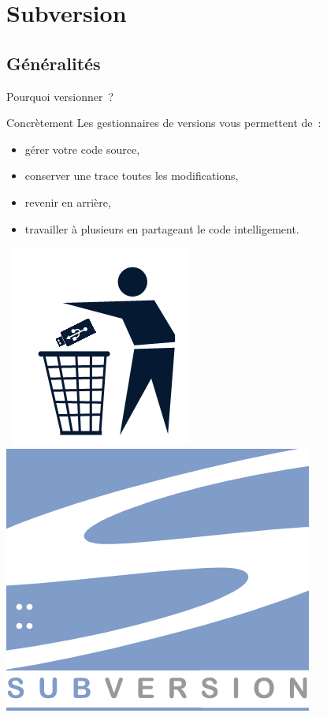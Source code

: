 
\section{Subversion}

\subsection{Généralités}
\begin{frame}{Pourquoi versionner~?}
  \begin{alertblock}{Concrètement}
    Les gestionnaires de versions vous permettent de~:
    \begin{itemize}
      \item gérer votre code source,
      \item conserver une trace toutes les modifications,
      \item revenir en arrière,
      \item travailler à plusieurs en partageant le code intelligement.
    \end{itemize}
  \end{alertblock}
  \begin{center}
  	\hspace{-1.6cm} \hbox{
  	\includegraphics[scale=0.3]{images/trash_usb} \hspace{1.5cm}
    \includegraphics[scale=3]{images/logo_svn} ~
}
\end{center}
\end{frame}
